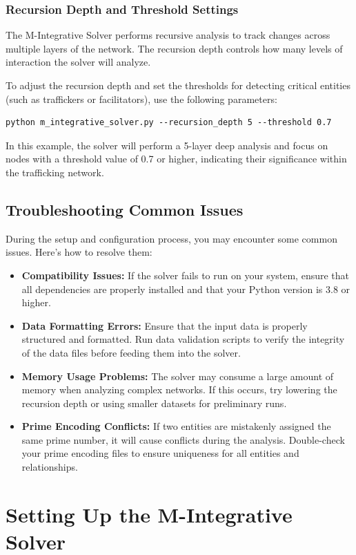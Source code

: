 \documentclass[%
 preprint, linenumbers,
 amsmath,amssymb,
 aps, physrev,
]{revtex4-2}
\begin{document}
\subsubsection{Recursion Depth and Threshold Settings}
The M-Integrative Solver performs recursive analysis to track changes across multiple layers of the network. The recursion depth controls how many levels of interaction the solver will analyze.

To adjust the recursion depth and set the thresholds for detecting critical entities (such as traffickers or facilitators), use the following parameters:
\begin{verbatim}
python m_integrative_solver.py --recursion_depth 5 --threshold 0.7
\end{verbatim}
In this example, the solver will perform a 5-layer deep analysis and focus on nodes with a threshold value of 0.7 or higher, indicating their significance within the trafficking network.

\subsection{Troubleshooting Common Issues}

During the setup and configuration process, you may encounter some common issues. Here’s how to resolve them:

\begin{itemize}
    \item \textbf{Compatibility Issues:} If the solver fails to run on your system, ensure that all dependencies are properly installed and that your Python version is 3.8 or higher.
    \item \textbf{Data Formatting Errors:} Ensure that the input data is properly structured and formatted. Run data validation scripts to verify the integrity of the data files before feeding them into the solver.
    \item \textbf{Memory Usage Problems:} The solver may consume a large amount of memory when analyzing complex networks. If this occurs, try lowering the recursion depth or using smaller datasets for preliminary runs.
    \item \textbf{Prime Encoding Conflicts:} If two entities are mistakenly assigned the same prime number, it will cause conflicts during the analysis. Double-check your prime encoding files to ensure uniqueness for all entities and relationships.
\end{itemize}

\section{Setting Up the M-Integrative Solver}
\end{document}
